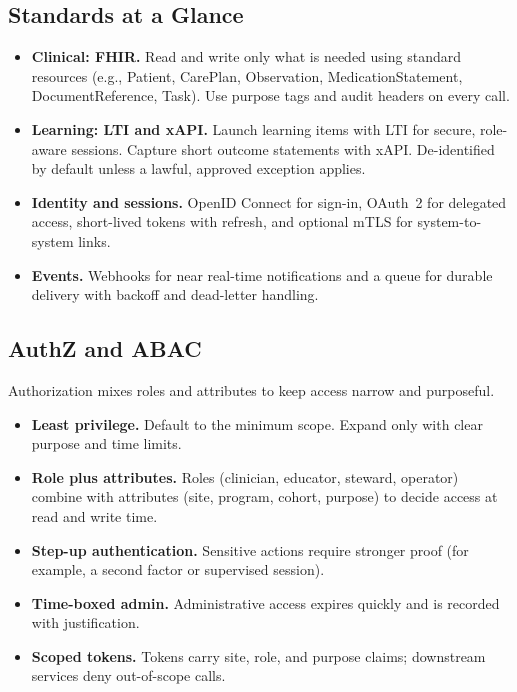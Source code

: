\documentclass[12pt]{article}
\begin{document}
\subsection*{Standards at a Glance}
\begin{itemize}[leftmargin=*]
  \item \textbf{Clinical: FHIR.} Read and write only what is needed using standard resources (e.g., Patient, CarePlan, Observation, MedicationStatement, DocumentReference, Task). Use purpose tags and audit headers on every call.
  \item \textbf{Learning: LTI and xAPI.} Launch learning items with LTI for secure, role-aware sessions. Capture short outcome statements with xAPI. De-identified by default unless a lawful, approved exception applies.
  \item \textbf{Identity and sessions.} OpenID Connect for sign-in, OAuth~2 for delegated access, short-lived tokens with refresh, and optional mTLS for system-to-system links.
  \item \textbf{Events.} Webhooks for near real-time notifications and a queue for durable delivery with backoff and dead-letter handling.
\end{itemize}

\subsection*{AuthZ and ABAC}
Authorization mixes roles and attributes to keep access narrow and purposeful.
\begin{itemize}[leftmargin=*]
  \item \textbf{Least privilege.} Default to the minimum scope. Expand only with clear purpose and time limits.
  \item \textbf{Role plus attributes.} Roles (clinician, educator, steward, operator) combine with attributes (site, program, cohort, purpose) to decide access at read and write time.
  \item \textbf{Step-up authentication.} Sensitive actions require stronger proof (for example, a second factor or supervised session).
  \item \textbf{Time-boxed admin.} Administrative access expires quickly and is recorded with justification.
  \item \textbf{Scoped tokens.} Tokens carry site, role, and purpose claims; downstream services deny out-of-scope calls.
\end{itemize}
\end{document}
